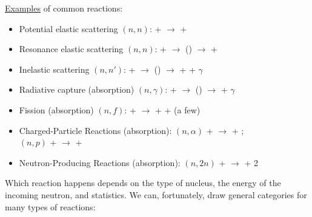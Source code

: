 \documentclass[12pt]{article}
\begin{document}
\underline{Examples} of common reactions:
\begin{itemize}
\item Potential elastic scattering $(n,n)$:  +  $\rightarrow$  + 

\item Resonance elastic scattering $(n,n)$:  +  $\rightarrow$ () $\rightarrow$  + 

\item Inelastic scattering $(n,n')$:  +  $\rightarrow$ () $\rightarrow$  +  + $\gamma$

\item Radiative capture (absorption) $(n,\gamma)$:  +  $\rightarrow$ () $\rightarrow$  + $\gamma$

\item Fission (absorption) $(n,f)$:  +  $\rightarrow$  +  + (a few)

\item Charged-Particle Reactions (absorption): $(n,\alpha)$  +  $\rightarrow$  + ; \\
\hspace*{17 em}$(n,p)$   +  $\rightarrow$  + 

\item Neutron-Producing Reactions (absorption): $(n,2n)$	  +  $\rightarrow$  + 2
\end{itemize}

Which reaction happens depends on the type of nucleus, the energy of the incoming neutron, and statistics. We can, fortunately, draw general categories for many types of reactions:
\end{document}
